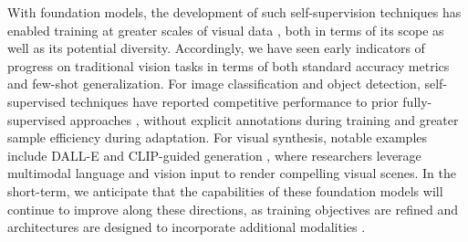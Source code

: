 With foundation models, the development of such self-supervision techniques has enabled training at greater scales of visual data \cite{changpinyo2021cc12m}, both in terms of its scope as well as its potential diversity. Accordingly, we have seen early indicators of progress on traditional vision tasks in terms of both standard accuracy metrics and few-shot generalization. For image classification and object detection, self-supervised techniques have reported competitive performance to prior fully-supervised approaches \cite{he2019moco,chen2020simclr,radford2021learning,henaff2021efficient}, without explicit annotations during training and greater sample efficiency during adaptation. For visual synthesis, notable examples include DALL-E \cite{ramesh2021zeroshot} and CLIP-guided generation \cite{radford2021learning, galatolo2021generating}, where researchers leverage multimodal language and vision input to render compelling visual scenes. In the short-term, we anticipate that the capabilities of these foundation models will continue to improve along these directions, as training objectives are refined \cite{chen2020mocov2,henaff2021efficient,selvaraju2021casting} and architectures are designed to incorporate additional modalities \cite{jaegle2021perceiver}.

